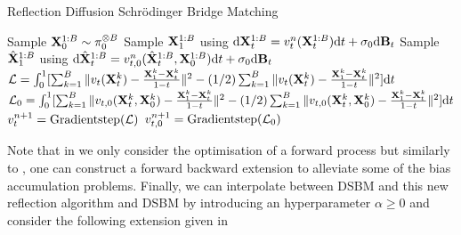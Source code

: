 \documentclass{article}
\begin{document}
\begin{algorithm}[H]
\caption{Reflection Diffusion Schr\"odinger Bridge Matching}
\label{alg:reflection_projection}
\begin{algorithmic}[1]
\STATE Sample $\mathbf{X}_0^{1:B} \sim \pi_0^{\otimes B}$ 
\STATE Sample $\mathbf{X}_1^{1:B}$ using $\mathrm{d} \mathbf{X}_t^{1:B} = v_t^n(\mathbf{X}_t^{1:B}) \mathrm{d} t + \sigma_0 \mathrm{d} \mathbf{B}_t $
\STATE Sample $\hat{\mathbf{X}}_1^{1:B}$ using $\mathrm{d} \hat{\mathbf{X}}_t^{1:B} = v_{t,0}^n(\hat{\mathbf{X}}_t^{1:B}, \mathbf{X}_0^{1:B}) \mathrm{d} t + \sigma_0 \mathrm{d} \mathbf{B}_t $
\STATE $\mathcal{L} = \int_0^1 [\sum_{k=1}^{B} \| v_t(\mathbf{X}_t^k) - \tfrac{\mathbf{X}_1^k - \mathbf{X}_t^k}{1-t} \|^2 - (1/2)\sum_{k=1}^B \| v_t(\mathbf{X}_t^k) - \tfrac{\mathbf{X}_1^k - \mathbf{X}_t^k}{1-t} \|^2] \mathrm{d} t $
\STATE $\mathcal{L}_0 = \int_0^1 [\sum_{k=1}^{B} \| v_{t,0}(\mathbf{X}_t^k, \mathbf{X}_0^k) - \tfrac{\mathbf{X}_1^k - \mathbf{X}_t^k}{1-t} \|^2 - (1/2) \sum_{k=1}^B \| v_{t,0}(\mathbf{X}_t^k, \mathbf{X}_0^k) - \tfrac{\mathbf{X}_1^k - \mathbf{X}_t^k}{1-t} \|^2] \mathrm{d} t $
\STATE $v^{n+1}_t = \mathrm{Gradient step}(\mathcal{L})$
\STATE $v^{n+1}_{t,0} = \mathrm{Gradient step}(\mathcal{L}_0)$
\ENDWHILE
\ENDFOR
{}
\end{algorithmic}
\end{algorithm}
Note that in  we only consider the optimisation of a forward process but similarly to , one can construct a forward backward extension to alleviate some of the bias accumulation problems. Finally, we can interpolate between DSBM and this new reflection algorithm and DSBM by introducing an hyperparameter $\alpha \geq 0$ and consider the following extension given in 
\end{document}

